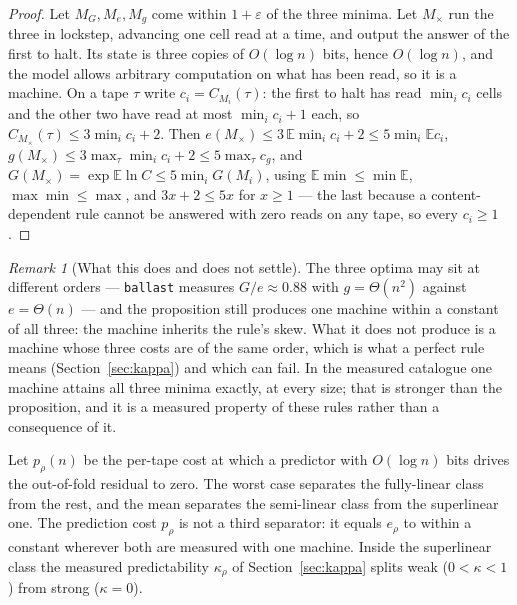 \documentclass[11pt]{article}
\theoremstyle{remark}
\newtheorem{remark}{Remark}
\begin{document}
\begin{proof}
Let $M_{G},M_{e},M_{g}$ come within $1+\varepsilon$ of the three minima. Let $M_{\times}$ run the three
in lockstep, advancing one cell read at a time, and output the answer of the first to halt. Its state is
three copies of $O(\log n)$ bits, hence $O(\log n)$, and the model allows arbitrary computation on what
has been read, so it is a machine. On a tape $\tau$ write $c_{i}=C_{M_{i}}(\tau)$: the first to halt has
read $\min_{i}c_{i}$ cells and the other two have read at most $\min_{i}c_{i}+1$ each, so
$C_{M_{\times}}(\tau)\le 3\min_{i}c_{i}+2$. Then
$e(M_{\times})\le 3\,\mathbb E\min_{i}c_{i}+2\le 5\min_{i}\mathbb E c_{i}$,
$g(M_{\times})\le 3\max_{\tau}\min_{i}c_{i}+2\le 5\max_{\tau}c_{g}$, and
$G(M_{\times})=\exp\mathbb E\ln C\le 5\min_{i}G(M_{i})$, using $\mathbb E\min\le\min\mathbb E$,
$\max\min\le\max$, and $3x+2\le5x$ for $x\ge1$ --- the last because a content-dependent rule cannot be
answered with zero reads on any tape, so every $c_{i}\ge1$.
\end{proof}

\begin{remark}[What this does and does not settle]\label{rem:simult}
The three optima may sit at different orders --- \texttt{ballast} measures $G/e\approx0.88$ with
$g=\Theta(n^{2})$ against $e=\Theta(n)$ --- and the proposition still produces one machine within a constant of all three: the
machine inherits the rule's skew. What it does not produce is a machine whose three costs are of the
same order, which is what a perfect rule means (Section~\ref{sec:kappa}) and which can fail. In the
measured catalogue one machine attains all three minima exactly, at every size; that is stronger than
the proposition, and it is a measured property of these rules rather than a consequence of it.
\end{remark}

Let
$p_{\rho}(n)$ be the per-tape cost at which a predictor with $O(\log n)$ bits drives the out-of-fold
residual to zero. The worst case separates
the fully-linear class from the rest, and the mean separates the semi-linear class from the
superlinear one. The prediction cost $p_{\rho}$ is not a third separator: it equals $e_{\rho}$ to
within a constant wherever both are measured with one machine. Inside the superlinear
class the measured predictability $\kappa_{\rho}$ of Section~\ref{sec:kappa} splits weak
($0<\kappa<1$) from strong ($\kappa=0$).
\end{document}
